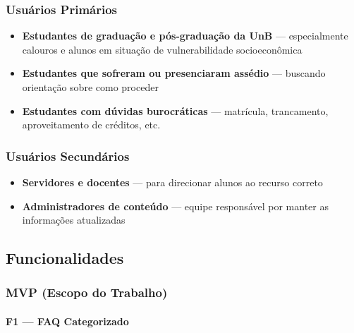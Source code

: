\documentclass[12pt, a4paper]{article}
\begin{document}
\subsubsection{Usuários Primários}

\begin{itemize}
  \item \textbf{Estudantes de graduação e pós-graduação da UnB} — especialmente calouros e alunos em situação de vulnerabilidade socioeconômica
  \item \textbf{Estudantes que sofreram ou presenciaram assédio} — buscando orientação sobre como proceder
  \item \textbf{Estudantes com dúvidas burocráticas} — matrícula, trancamento, aproveitamento de créditos, etc.
\end{itemize}

\subsubsection{Usuários Secundários}

\begin{itemize}
  \item \textbf{Servidores e docentes} — para direcionar alunos ao recurso correto
  \item \textbf{Administradores de conteúdo} — equipe responsável por manter as informações atualizadas
\end{itemize}

\subsection{Funcionalidades}

\subsubsection{MVP (Escopo do Trabalho)}

\paragraph{F1 — FAQ Categorizado}
\end{document}
